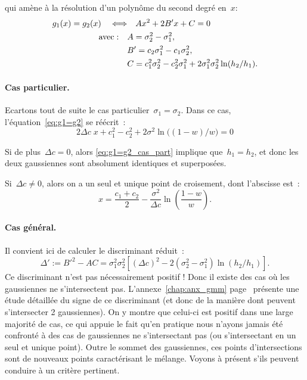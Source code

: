 \documentclass[main.tex]{subfiles}
\begin{document}
qui amène à la résolution d'un polynôme du second degré en~$x$:
\begin{equation}
\begin{aligned}
\label{eq:g1=g2}
g_1(x)=g_2(x) \quad \Longleftrightarrow & \quad  Ax^2 + 2B'x + C =0 \\
{\rm avec :} \quad &A=\sigma_2^2 - \sigma_1^2, \\
& B'=c_2\sigma_1^2-c_1\sigma_2^2,\\
& C= c_1^2\sigma_2^2-c_2^2\sigma_1^2 +  2\sigma_1^2\sigma_2^2 \ln( h_2 / h_1 ).
\end{aligned}
\end{equation}
\paragraph{Cas particulier. \label{para:cas_partic_polynome}}
Ecartons tout de suite le cas particulier~$\sigma_1=\sigma_2$. %
Dans ce cas, l'équation~\eqref{eq:g1=g2} se réécrit~:
\begin{equation}
\label{eq:g1=g2_cas_part}
2\Delta c \; x + c_1^2-c_2^2 +  2 \sigma^2 \ln \big( (1-w) / w \big) = 0
\end{equation}
\begin{myitemize}
\item Si de plus~$\Delta c=0$, alors \eqref{eq:g1=g2_cas_part} implique que~$h_1=h_2$, et donc les deux gaussiennes sont absolument identiques et superposées.
\item Si~$\Delta c\neq0$, alors on a un seul et unique point de croisement, dont l'abscisse est~:
\begin{equation}
\label{eq:pt_croisement_unique}
x=\dfrac{c_1+c_2}{2}-\dfrac{\sigma^2}{\Delta c}\ln \left( \dfrac{1-w}{w} \right).
\end{equation}
\end{myitemize}
\paragraph{Cas général.} Il convient ici de calculer le discriminant réduit~:
\begin{equation}
\label{eq:discr_reduit}
\Delta' := B'^2 - AC = \sigma_1^2 \sigma_2^2 \left[ (\Delta c)^2 - 2(\sigma_2^2-\sigma_1^2) \ln (h_2/h_1)  \right].
\end{equation}
Ce discriminant n'est pas nécessairement positif ! Donc il existe des cas où les gaussiennes ne s'intersectent pas. L'annexe~\ref{chap:anx_gmm} page~\pageref{chap:anx_gmm} présente une étude détaillée  du signe de ce discriminant (et donc de la manière dont peuvent s'intersecter 2 gaussiennes). On y montre que celui-ci est positif dans une large majorité de cas, ce qui appuie le fait qu'en pratique nous n'ayons jamais été confronté à des cas de gaussiennes ne s'intersectant pas (ou s'intersectant en un seul et unique point). 
Outre le sommet des gaussiennes, ces points d'intersections sont de nouveaux points caractérisant le mélange. Voyons à présent s'ils peuvent conduire à un critère pertinent.
\end{document}
